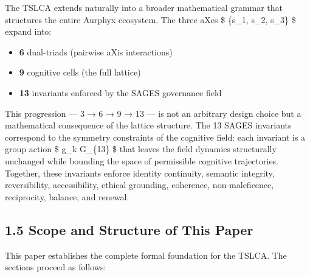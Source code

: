 The TSLCA extends naturally into a broader mathematical grammar that structures the entire Aurphyx ecosystem. The three aXes \$ \{s\_1, s\_2, s\_3\} \$ expand into:

\begin{itemize}
\tightlist
\item
  \textbf{6} dual-triads (pairwise aXis interactions)
\item
  \textbf{9} cognitive cells (the full lattice)
\item
  \textbf{13} invariants enforced by the SAGES governance field
\end{itemize}

This progression --- 3 → 6 → 9 → 13 --- is not an arbitrary design choice but a mathematical consequence of the lattice structure. The 13 SAGES invariants correspond to the symmetry constraints of the cognitive field: each invariant is a group action \$ g\_k \in G\_\{13\} \$ that leaves the field dynamics structurally unchanged while bounding the space of permissible cognitive trajectories. Together, these invariants enforce identity continuity, semantic integrity, reversibility, accessibility, ethical grounding, coherence, non-maleficence, reciprocity, balance, and renewal.

\subsection{1.5 Scope and Structure of This Paper}\label{scope-and-structure-of-this-paper}

This paper establishes the complete formal foundation for the TSLCA. The sections proceed as follows:

